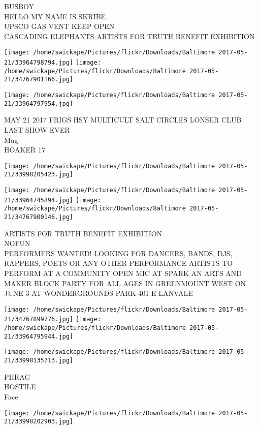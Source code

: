 \documentclass[10pt,letterpaper]{article}
\begin{document}
BUSBOY\\
HELLO MY NAME IS SKRIBE\\
UPSCO GAS VENT KEEP OPEN\\
CASCADING ELEPHANTS ARTISTS FOR TRUTH BENEFIT EXHIBITION
\pagebreak

\texttt{[image: /home/swickape/Pictures/flickr/Downloads/Baltimore 2017-05-21/33964798794.jpg]}
\texttt{[image: /home/swickape/Pictures/flickr/Downloads/Baltimore 2017-05-21/34767901166.jpg]}

\vspace{0.25in}
\texttt{[image: /home/swickape/Pictures/flickr/Downloads/Baltimore 2017-05-21/33964797954.jpg]}

MAY 21 2017 FRIGS HSY MULTICULT SALT CIRCLES LONSER CLUB LAST SHOW EVER\\
Mug\\
HOAKER 17
\pagebreak

\texttt{[image: /home/swickape/Pictures/flickr/Downloads/Baltimore 2017-05-21/33998205423.jpg]}

\vspace{0.25in}
\texttt{[image: /home/swickape/Pictures/flickr/Downloads/Baltimore 2017-05-21/33964745894.jpg]}
\texttt{[image: /home/swickape/Pictures/flickr/Downloads/Baltimore 2017-05-21/34767900146.jpg]}

ARTISTS FOR TRUTH BENEFIT EXHIBITION\\
NOFUN\\
PERFORMERS WANTED!  LOOKING FOR DANCERS, BANDS, DJS, RAPPERS, POETS OR ANY OTHER PERFORMANCE ARTISTS TO PERFORM AT A COMMUNITY OPEN MIC AT SPARK AN ARTS AND MAKER BLOCK PARTY FOR ALL AGES IN GREENMOUNT WEST ON JUNE 3 AT WONDERGROUNDS PARK 401 E LANVALE
\pagebreak

\texttt{[image: /home/swickape/Pictures/flickr/Downloads/Baltimore 2017-05-21/34767899776.jpg]}
\texttt{[image: /home/swickape/Pictures/flickr/Downloads/Baltimore 2017-05-21/33964795944.jpg]}

\vspace{0.25in}
\texttt{[image: /home/swickape/Pictures/flickr/Downloads/Baltimore 2017-05-21/33998135713.jpg]}

PHRAG\\
HOSTILE\\
Face
\pagebreak

\texttt{[image: /home/swickape/Pictures/flickr/Downloads/Baltimore 2017-05-21/33998202903.jpg]}
\end{document}

